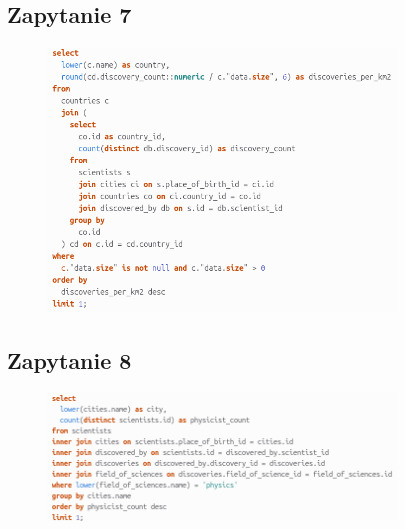 \documentclass[11pt]{article}
\begin{document}
\newpage
	\subsection{Zapytanie 7}
		\begin{figure}[!ht]
			\begin{center}
				\includegraphics[width=350px]{s7.png}
			\end{center}
		\end{figure}
	\subsection{Zapytanie 8}
		\begin{figure}[!ht]
			\begin{center}
				\includegraphics[width=350px]{s8.png}
			\end{center}
		\end{figure}


\newpage
\end{document}
